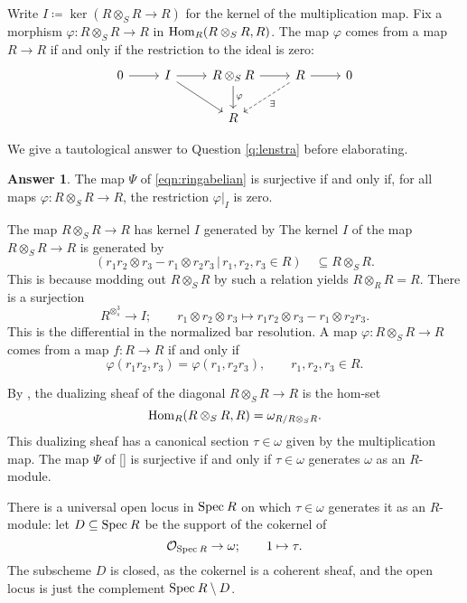 \documentclass[11pt,reqno]{amsart}
\theoremstyle{definition}
\newtheorem{answer}[theorem]{Answer}
\newcommand{\OO}{\mathcal{O}}
\newcommand{\Spec}{{\rm{Spec}\:}}
\newcommand{\Hom}{{\rm Hom}}
\newcommand{\Leo}[2][inline]{\todo[linecolor=blue,backgroundcolor=blue!25,bordercolor=blue,#1,shadow,author=Leo]{#2}} %
\begin{document}
Write $I \coloneqq \ker(R \otimes_S R \to R)$ for the kernel of the multiplication map. Fix a morphism $\varphi : R \otimes_S R \to R$ in $\Hom_R(R \otimes_S R, R)$. The map $\varphi$ comes from a map $R \to R$ if and only if the restriction to the ideal is zero:
\[
\begin{tikzcd}
0 \ar[r] 	&I \ar[dr] \ar[r] 		&R \otimes_S R \ar[d, "\varphi"] \ar[r] 		&R \ar[r] \ar[dl, dashed, "\exists"] 		&0 		\\
		&&R
\end{tikzcd}
\]

We give a tautological answer to Question \ref{q:lenstra} before elaborating. 

\begin{answer}

The map $\Psi$ of \eqref{eqn:ringabelian} is surjective if and only if, for all maps $\varphi : R \otimes_S R \to R$, the restriction $\varphi|_I$ is zero. 

\end{answer}





The map $R \otimes_S R \to R$ has kernel $I$ generated by 
The kernel $I$ of the map $R \otimes_S R \to R$ is generated by 
\[(r_1 r_2 \otimes r_3 - r_1 \otimes r_2 r_3 \, | \, r_1, r_2, r_3 \in R) \quad \subseteq R \otimes_S R.\] 
This is because modding out $R \otimes_S R$ by such a relation yields $R \otimes_R R = R$. There is a surjection
\[R^{\otimes_s^3} \to I; \qquad r_1 \otimes r_2 \otimes r_3 \mapsto r_1 r_2 \otimes r_3 - r_1 \otimes r_2 r_3.\]
This is the differential in the normalized bar resolution. A map $\varphi : R \otimes_S R \to R$ comes from a map $f : R \to R$ if and only if 
\begin{equation}\label{eqn:tensorprodrelns}
\varphi(r_1r_2, r_3) = \varphi(r_1, r_2 r_3), \qquad r_1, r_2, r_3 \in R.
\end{equation}



By \cite[0BSZ]{stacks-project}, the dualizing sheaf of the diagonal $R \otimes_S R \to R$ is the hom-set
\Leo{This is otherwise known as $T_{R/S}$!}
\[\Hom_R(R \otimes_S R, R) = \omega_{R/R \otimes_S R}.\]
This dualizing sheaf has a canonical section $\tau \in \omega$ given by the multiplication map. The map $\Psi$ of \eqref{} is surjective if and only if $\tau \in \omega$ generates $\omega$ as an $R$-module. 

There is a universal open locus in $\Spec R$ on which $\tau \in \omega$ generates it as an $R$-module: let $D \subseteq \Spec R$ be the support of the cokernel of 
\[\OO_{\Spec R} \to \omega; \qquad 1 \mapsto \tau.\]
The subscheme $D$ is closed, as the cokernel is a coherent sheaf, and the open locus is just the complement $\Spec R \setminus D$. 
\end{document}
